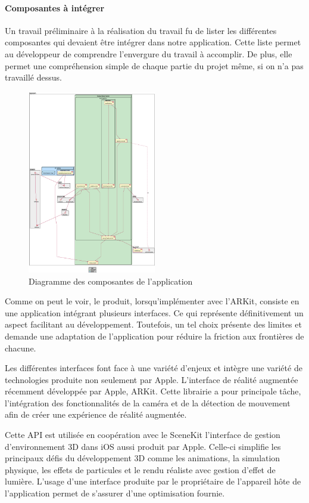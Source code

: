 \documentclass[rapport.tex]{subfiles}
\begin{document}
\paragraph*{Composantes à intégrer}
Un travail préliminaire à la réalisation du travail fu de lister les différentes composantes qui devaient être intégrer dans notre application. Cette liste permet au développeur de comprendre l'envergure du travail à accomplir. De plus, elle permet une compréhension simple de chaque partie du projet même, si on n'a pas travaillé dessus.
\begin{figure}[H]
    \includegraphics[width=0.5\textwidth]{project-architecture.eps}
\centering
    \caption{Diagramme des composantes de l'application}
\end{figure}
\par
Comme on peut le voir, le produit, lorsqu’implémenter avec l’ARKit, consiste en une application intégrant plusieurs interfaces. Ce qui représente définitivement un aspect facilitant au développement. Toutefois, un tel choix présente des limites et demande une adaptation de l’application pour réduire la friction aux frontières de chacune.
\par
Les différentes interfaces font face à une variété d’enjeux et intègre une variété de technologies produite non seulement par Apple. L’interface de réalité augmentée récemment développée par Apple, ARKit. Cette librairie a pour principale tâche, l’intégration des fonctionnalités de la caméra et de la détection de mouvement afin de créer une expérience de réalité augmentée.\citep*{aRKitDoc}
\par
Cette API est utilisée en coopération avec le SceneKit l’interface de gestion d’environnement 3D dans iOS aussi produit par Apple. Celle-ci simplifie les principaux défis du développement 3D comme les animations, la simulation physique, les effets de particules et le rendu réaliste avec gestion d’effet de lumière. L’usage d’une interface produite par le propriétaire de l’appareil hôte de l’application permet de s’assurer d’une optimisation fournie.\citep*{sceneKitDoc}
\end{document}
